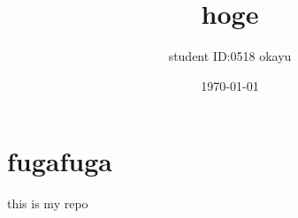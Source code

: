 \documentclass[a4paper, dvipdfmx]{jsarticle}
\title{\Large{hoge}}
\author{
	student ID:0518
	okayu
}
\date{\today}
\begin{document}
\maketitle


\section*{fugafuga}
this is my repo \cite{okayu0518kut}



\end{document}
